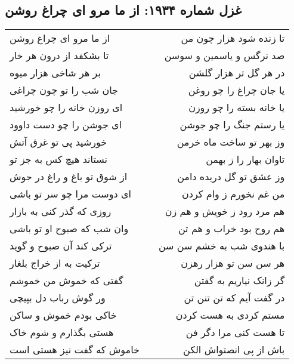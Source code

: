 \begin{center}
\section*{غزل شماره ۱۹۳۴: از ما مرو ای چراغ روشن}
\label{sec:1934}
\begin{longtable}{l p{0.5cm} r}
از ما مرو ای چراغ روشن
&&
تا زنده شود هزار چون من
\\
تا بشکفد از درون هر خار
&&
صد نرگس و یاسمین و سوسن
\\
بر هر شاخی هزار میوه
&&
در هر گل تر هزار گلشن
\\
جان شب را تو چون چراغی
&&
یا جان چراغ را چو روغن
\\
ای روزن خانه را چو خورشید
&&
یا خانه بسته را چو روزن
\\
ای جوشن را چو دست داوود
&&
یا رستم جنگ را چو جوشن
\\
خورشید پی تو غرق آتش
&&
وز بهر تو ساخت ماه خرمن
\\
نستاند هیچ کس به جز تو
&&
تاوان بهار را ز بهمن
\\
از شوق تو باغ و راغ در جوش
&&
وز عشق تو گل دریده دامن
\\
ای دوست مرا چو سر تو باشی
&&
من غم نخورم ز وام کردن
\\
روزی که گذر کنی به بازار
&&
هم مرد رود ز خویش و هم زن
\\
وان شب که صبوح او تو باشی
&&
هم روح بود خراب و هم تن
\\
ترکی کند آن صبوح و گوید
&&
با هندوی شب به خشم سن سن
\\
ترکیت به از خراج بلغار
&&
هر سن سن تو هزار رهزن
\\
گفتی که خموش من خموشم
&&
گر زانک نیاریم به گفتن
\\
ور گوش رباب دل بپیچی
&&
در گفت آیم که تن تنن تن
\\
خاکی بودم خموش و ساکن
&&
مستم کردی به هست کردن
\\
هستی بگذارم و شوم خاک
&&
تا هست کنی مرا دگر فن
\\
خاموش که گفت نیز هستی است
&&
باش از پی انصتواش الکن
\\
\end{longtable}
\end{center}
